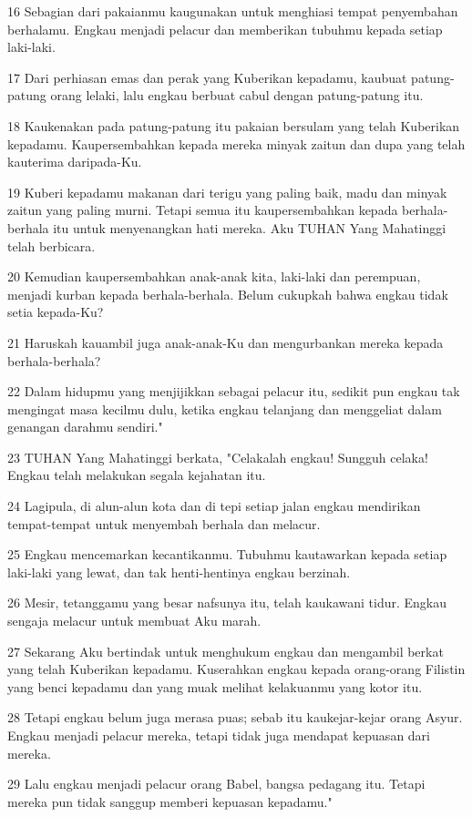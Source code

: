\par 16 Sebagian dari pakaianmu kaugunakan untuk menghiasi tempat penyembahan berhalamu. Engkau menjadi pelacur dan memberikan tubuhmu kepada setiap laki-laki.
\par 17 Dari perhiasan emas dan perak yang Kuberikan kepadamu, kaubuat patung-patung orang lelaki, lalu engkau berbuat cabul dengan patung-patung itu.
\par 18 Kaukenakan pada patung-patung itu pakaian bersulam yang telah Kuberikan kepadamu. Kaupersembahkan kepada mereka minyak zaitun dan dupa yang telah kauterima daripada-Ku.
\par 19 Kuberi kepadamu makanan dari terigu yang paling baik, madu dan minyak zaitun yang paling murni. Tetapi semua itu kaupersembahkan kepada berhala-berhala itu untuk menyenangkan hati mereka. Aku TUHAN Yang Mahatinggi telah berbicara.
\par 20 Kemudian kaupersembahkan anak-anak kita, laki-laki dan perempuan, menjadi kurban kepada berhala-berhala. Belum cukupkah bahwa engkau tidak setia kepada-Ku?
\par 21 Haruskah kauambil juga anak-anak-Ku dan mengurbankan mereka kepada berhala-berhala?
\par 22 Dalam hidupmu yang menjijikkan sebagai pelacur itu, sedikit pun engkau tak mengingat masa kecilmu dulu, ketika engkau telanjang dan menggeliat dalam genangan darahmu sendiri."
\par 23 TUHAN Yang Mahatinggi berkata, "Celakalah engkau! Sungguh celaka! Engkau telah melakukan segala kejahatan itu.
\par 24 Lagipula, di alun-alun kota dan di tepi setiap jalan engkau mendirikan tempat-tempat untuk menyembah berhala dan melacur.
\par 25 Engkau mencemarkan kecantikanmu. Tubuhmu kautawarkan kepada setiap laki-laki yang lewat, dan tak henti-hentinya engkau berzinah.
\par 26 Mesir, tetanggamu yang besar nafsunya itu, telah kaukawani tidur. Engkau sengaja melacur untuk membuat Aku marah.
\par 27 Sekarang Aku bertindak untuk menghukum engkau dan mengambil berkat yang telah Kuberikan kepadamu. Kuserahkan engkau kepada orang-orang Filistin yang benci kepadamu dan yang muak melihat kelakuanmu yang kotor itu.
\par 28 Tetapi engkau belum juga merasa puas; sebab itu kaukejar-kejar orang Asyur. Engkau menjadi pelacur mereka, tetapi tidak juga mendapat kepuasan dari mereka.
\par 29 Lalu engkau menjadi pelacur orang Babel, bangsa pedagang itu. Tetapi mereka pun tidak sanggup memberi kepuasan kepadamu."
